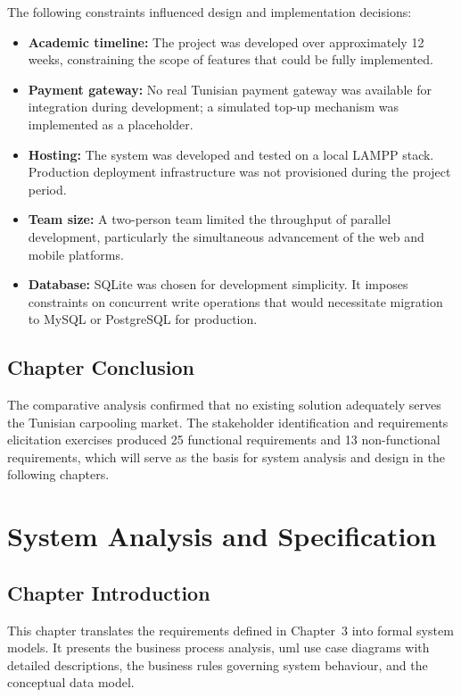 \documentclass[12pt,a4paper,openright]{report}
\begin{document}
The following constraints influenced design and implementation decisions:

\begin{itemize}[noitemsep]
    \item \textbf{Academic timeline:} The project was developed over approximately 12 weeks, constraining the scope of features that could be fully implemented.
    \item \textbf{Payment gateway:} No real Tunisian payment gateway was available for integration during development; a simulated top-up mechanism was implemented as a placeholder.
    \item \textbf{Hosting:} The system was developed and tested on a local LAMPP stack. Production deployment infrastructure was not provisioned during the project period.
    \item \textbf{Team size:} A two-person team limited the throughput of parallel development, particularly the simultaneous advancement of the web and mobile platforms.
    \item \textbf{Database:} SQLite was chosen for development simplicity. It imposes constraints on concurrent write operations that would necessitate migration to MySQL or PostgreSQL for production.
\end{itemize}

\section*{Chapter Conclusion}

The comparative analysis confirmed that no existing solution adequately serves the Tunisian carpooling market. The stakeholder identification and requirements elicitation exercises produced 25 functional requirements and 13 non-functional requirements, which will serve as the basis for system analysis and design in the following chapters.

\chapter{System Analysis and Specification}

\section*{Chapter Introduction}
This chapter translates the requirements defined in Chapter~3 into formal system models. It presents the business process analysis, \gls{uml} use case diagrams with detailed descriptions, the business rules governing system behaviour, and the conceptual data model.
\end{document}
